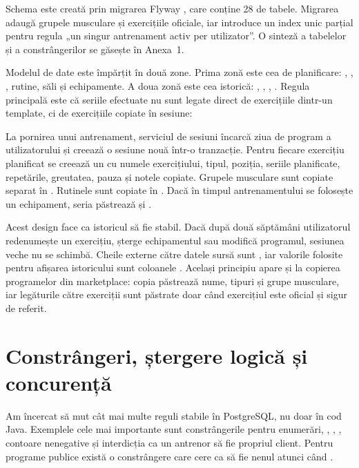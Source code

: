 Schema este creată prin migrarea Flyway , care conține 28 de tabele. Migrarea 
adaugă grupele musculare și exercițiile oficiale, iar  introduce un index unic parțial pentru
regula „un singur antrenament activ per utilizator”. O sinteză a tabelelor și a constrângerilor se
găsește în Anexa~1.

Modelul de date este împărțit în două zone. Prima zonă este cea de planificare: ,
, , rutine, săli și echipamente. A doua zonă este cea
istorică: , , ,
. Regula principală este că seriile efectuate nu sunt legate direct de exercițiile
dintr-un template, ci de exercițiile copiate în sesiune:

\begin{center}
\end{center}

La pornirea unui antrenament, serviciul de sesiuni încarcă ziua de program a utilizatorului și creează
o sesiune nouă într-o tranzacție. Pentru fiecare exercițiu planificat se creează un
 cu numele exercițiului, tipul, poziția, seriile planificate, repetările,
greutatea, pauza și notele copiate. Grupele musculare sunt copiate separat în
. Rutinele sunt copiate în . Dacă în
timpul antrenamentului se folosește un echipament, seria păstrează și .

Acest design face ca istoricul să fie stabil. Dacă după două săptămâni utilizatorul redenumește un
exercițiu, șterge echipamentul sau modifică programul, sesiunea veche nu se schimbă. Cheile externe
către datele sursă sunt , iar valorile folosite pentru afișarea istoricului
sunt coloanele . Același principiu apare și la copierea programelor din marketplace:
copia păstrează nume, tipuri și grupe musculare, iar legăturile către exerciții sunt păstrate doar
când exercițiul este oficial și sigur de referit.

\section{Constrângeri, ștergere logică și concurență}

Am încercat să mut cât mai multe reguli stabile în PostgreSQL, nu doar în cod Java. Exemplele cele mai
importante sunt constrângerile  pentru enumerări, ,
, , contoare nenegative și interdicția
ca un antrenor să fie propriul client. Pentru programe publice există o constrângere care cere ca
 să fie nenul atunci când .

